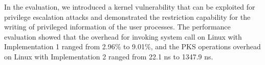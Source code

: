 %
%

%
%
%
In the evaluation, we introduced a kernel vulnerability that can be exploited for
privilege escalation attacks and demonstrated the restriction capability for the
writing of privileged information of the user processes.
%
The performance evaluation showed that the overhead for invoking system call 
on Linux with Implementation 1 ranged from 2.96\% to 9.01\%, and the PKS
operations overhead on Linux with Implementation 2 ranged from 22.1 ns to 1347.9
ns.

